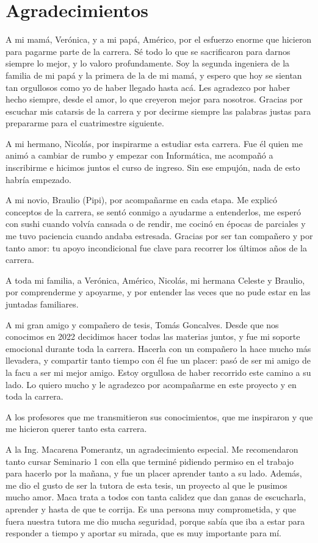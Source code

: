 \chapter*{Agradecimientos}

A mi mamá, Verónica, y a mi papá, Américo, por el esfuerzo enorme que hicieron para pagarme parte de la carrera. Sé todo lo que se sacrificaron para darnos siempre lo mejor, y lo valoro profundamente. Soy la segunda ingeniera de la familia de mi papá y la primera de la de mi mamá, y espero que hoy se sientan tan orgullosos como yo de haber llegado hasta acá. Les agradezco por haber hecho siempre, desde el amor, lo que creyeron mejor para nosotros. Gracias por escuchar mis catarsis de la carrera y por decirme siempre las palabras justas para prepararme para el cuatrimestre siguiente.

A mi hermano, Nicolás, por inspirarme a estudiar esta carrera. Fue él quien me animó a cambiar de rumbo y empezar con Informática, me acompañó a inscribirme e hicimos juntos el curso de ingreso. Sin ese empujón, nada de esto habría empezado.

A mi novio, Braulio (Pipi), por acompañarme en cada etapa. Me explicó conceptos de la carrera, se sentó conmigo a ayudarme a entenderlos, me esperó con sushi cuando volvía cansada o de rendir, me cocinó en épocas de parciales y me tuvo paciencia cuando andaba estresada. Gracias por ser tan compañero y por tanto amor: tu apoyo incondicional fue clave para recorrer los últimos años de la carrera.

A toda mi familia, a Verónica, Américo, Nicolás, mi hermana Celeste y Braulio, por comprenderme y apoyarme, y por entender las veces que no pude estar en las juntadas familiares.

A mi gran amigo y compañero de tesis, Tomás Goncalves. Desde que nos conocimos en 2022 decidimos hacer todas las materias juntos, y fue mi soporte emocional durante toda la carrera. Hacerla con un compañero la hace mucho más llevadera, y compartir tanto tiempo con él fue un placer: pasó de ser mi amigo de la facu a ser mi mejor amigo. Estoy orgullosa de haber recorrido este camino a su lado. Lo quiero mucho y le agradezco por acompañarme en este proyecto y en toda la carrera.

A los profesores que me transmitieron sus conocimientos, que me inspiraron y que me hicieron querer tanto esta carrera.

A la Ing. Macarena Pomerantz, un agradecimiento especial. Me recomendaron tanto cursar Seminario 1 con ella que terminé pidiendo permiso en el trabajo para hacerlo por la mañana, y fue un placer aprender tanto a su lado. Además, me dio el gusto de ser la tutora de esta tesis, un proyecto al que le pusimos mucho amor. Maca trata a todos con tanta calidez que dan ganas de escucharla, aprender y hasta de que te corrija. Es una persona muy comprometida, y que fuera nuestra tutora me dio mucha seguridad, porque sabía que iba a estar para responder a tiempo y aportar su mirada, que es muy importante para mí.

